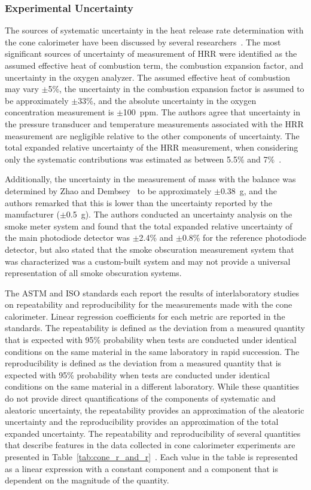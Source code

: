 \documentclass[12pt,oneside]{book}
\begin{document}
\subsubsection{Experimental Uncertainty}

The sources of systematic uncertainty in the heat release rate determination with the cone calorimeter have been discussed by several researchers~\cite{Enright,Brohez,Zhao}. The most significant sources of uncertainty of measurement of HRR were identified as the assumed effective heat of combustion term, the combustion expansion factor, and uncertainty in the oxygen analyzer. The assumed effective heat of combustion may vary $\pm$5\%, the uncertainty in the combustion expansion factor is assumed to be approximately $\pm$33\%, and the absolute uncertainty in the oxygen concentration measurement is $\pm$100~ppm. The authors agree that uncertainty in the pressure transducer and temperature measurements associated with the HRR measurement are negligible relative to the other components of uncertainty. The total expanded relative uncertainty of the HRR measurement, when considering only the systematic contributions was estimated as between 5.5\% and 7\%~\cite{Enright,Zhao}. 

Additionally, the uncertainty in the measurement of mass with the balance was determined by Zhao and Dembsey~\cite{Zhao} to be approximately $\pm$0.38~g, and the authors remarked that this is lower than the uncertainty reported by the manufacturer ($\pm$0.5~g). The authors conducted an uncertainty analysis on the smoke meter system and found that the total expanded relative uncertainty of the main photodiode detector was $\pm$2.4\% and $\pm$0.8\% for the reference photodiode detector, but also stated that the smoke obscuration measurement system that was characterized was a custom-built system and may not provide a universal representation of all smoke obscuration systems.

The ASTM and ISO standards each report the results of interlaboratory studies on repeatability and reproducibility for the measurements made with the cone calorimeter. Linear regression coefficients for each metric are reported in the standards. The repeatability is defined as the deviation from a measured quantity that is expected with 95\% probability when tests are conducted under identical conditions on the same material in the same laboratory in rapid succession. The reproducibility is defined as the deviation from a measured quantity that is expected with 95\% probability when tests are conducted under identical conditions on the same material in a different laboratory. While these quantities do not provide direct quantifications of the components of systematic and aleatoric uncertainty, the repeatability provides an approximation of the aleatoric uncertainty and the reproducibility provides an approximation of the total expanded uncertainty. The repeatability and reproducibility of several quantities that describe features in the data collected in cone calorimeter experiments are presented in Table~\ref{tab:cone_r_and_r}~\cite{ASTM_E1354,ISO_5660-1}. Each value in the table is represented as a linear expression with a constant component and a component that is dependent on the magnitude of the quantity.
\end{document}
